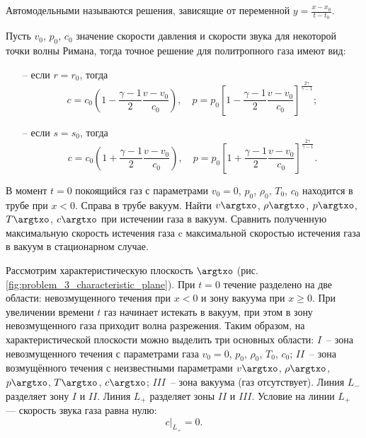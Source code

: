 \documentclass[14pt]{extarticle}
\begin{document}
\begin{dfn}
\alert{Автомодельными} называются решения, зависящие от переменной $y=\displaystyle\frac{x-x_0}{t-t_0}$.
\end{dfn}

Пусть $v_0$, $p_0$, $c_0$ значение скорости давления и скорости звука для некоторой точки волны Римана, тогда точное решение для политропного газа имеют вид:
\begin{itemize}
\item[--]
	если $r = r_0$, тогда 
	\begin{equation}
		\label{eq:solution_r_wave}
		c=c_0\left(
		1 - \frac{\gamma-1}{2}\frac{v-v_0}{c_0}
		\right),\quad
		p = p_0 \left[
		1 - \frac{\gamma-1}{2} \frac{v-v_0}{c_0}
		\right]^{\frac{2\gamma}{\gamma-1}};
	\end{equation}
\item[--] если $s = s_0$, тогда
	\begin{equation}
		\label{eq:solution_l_wave}
		c=c_0\left(
		1 + \frac{\gamma-1}{2}\frac{v-v_0}{c_0}
		\right),\quad
		p = p_0 \left[
		1 + \frac{\gamma-1}{2} \frac{v-v_0}{c_0}
		\right]^{\frac{2\gamma}{\gamma-1}}.
	\end{equation}
\end{itemize}

\begin{problem}
В момент $t=0$  покоящийся газ с параметрами $v_0 = 0$, $p_0$, $\rho_0$, $T_0$, $c_0$ находится в трубе при $x<0$. Справа в трубе вакуум. Найти $v\argtxo$, $\rho\argtxo$, $p\argtxo$, $T\argtxo$, $c\argtxo$ при истечении газа в вакуум. Сравнить полученную максимальную скорость истечения газа c максимальной скоростью истечения газа в вакуум в стационарном случае.
\end{problem}

Рассмотрим характеристическую плоскость $\argtxo$ (рис. \ref{fig:problem_3_characteristic_plane}). При $t=0$ течение разделено на две области: невозмущенного течения при $x < 0$ и зону вакуума при $ x \geq 0$.
При увеличении времени $t$ газ начинает истекать в вакуум, при этом в зону невозмущенного газа приходит волна разрежения. Таким образом, на характеристической плоскости можно выделить три основных области: $I$~-- зона невозмущенного течения с параметрами газа $v_0 = 0$, $p_0$, $\rho_0$, $T_0$, $c_0$; $II$~-- зона возмущённого течения с неизвестными параметрами $v\argtxo$, $\rho\argtxo$, $p\argtxo$, $T\argtxo$, $c\argtxo$; $III$~-- зона вакуума (газ отсутствует). Линия $L_-$ разделяет зону $I$ и $II$. Линия $L_+$ разделяет зоны $II$ и $III$. Условие на линии $L_+$ --- скорость звука газа равна нулю:
\[
c|_{L_+}=0.
\]
\end{document}
